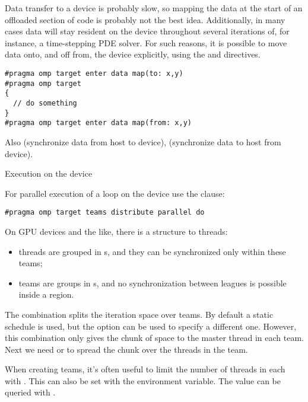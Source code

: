Data transfer to a device is probably slow,
so mapping the data at the start of an offloaded section of code
is probably not the best idea.
Additionally, in many cases data will stay resident on the device
throughout several iterations of, for instance, a time-stepping \ac{PDE} solver.
For such reasons, it is possible to move data onto, and off from,
the device explicitly,
using the  and
 directives.

\begin{lstlisting}[language=omp]
#pragma omp target enter data map(to: x,y)
#pragma omp target
{
  // do something
}
#pragma omp target enter data map(from: x,y)
\end{lstlisting}

Also 
(synchronize data from host to device),
(synchronize data to host from device).

 {Execution on the device}
\label{sec:omp-team}

For parallel execution of a loop on the device
use the  clause:
\begin{lstlisting}[language=omp]
#pragma omp target teams distribute parallel do
\end{lstlisting}

On GPU devices and the like, there is a structure to threads:
\begin{itemize}
\item threads are grouped in s,
  and they can be synchronized only within these teams;
\item teams are groups in s,
  and no synchronization between leagues is possible
  inside a  region.
\end{itemize}

The combination  splits the iteration space over teams.
By default a static schedule is used,
but the option  can be used to specify a different one.
However, this combination only gives the chunk of space to the master thread
in each team.
Next we need  or  to spread the chunk over the
threads in the team.

When creating teams, it's often useful to limit the number of threads in each
with .
This can also be set with the 
environment variable.
The value can be queried with .

